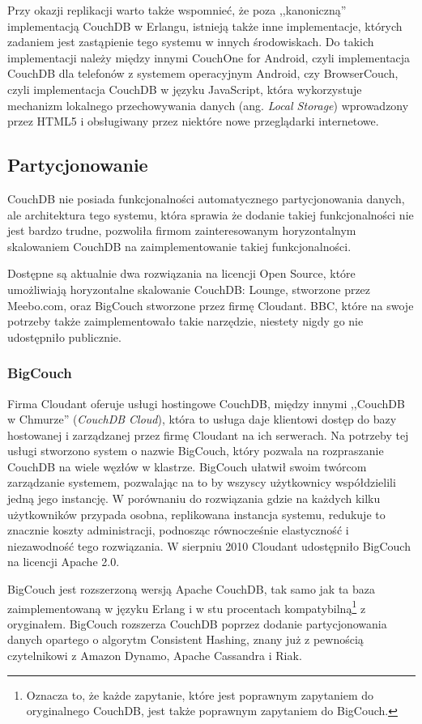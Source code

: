 Przy okazji replikacji warto także wspomnieć, że poza ,,kanoniczną'' implementacją CouchDB w Erlangu, istnieją także inne implementacje, których zadaniem jest zastąpienie tego systemu w innych środowiskach.
Do takich implementacji należy między innymi CouchOne for Android, czyli implementacja CouchDB dla telefonów z systemem operacyjnym Android, czy BrowserCouch, czyli implementacja CouchDB w języku JavaScript, która wykorzystuje mechanizm lokalnego przechowywania danych (ang. \emph{Local Storage}) wprowadzony przez HTML5 i obsługiwany przez niektóre nowe przeglądarki internetowe.

\subsection*{Partycjonowanie}

CouchDB nie posiada funkcjonalności automatycznego partycjonowania danych, ale architektura tego systemu, która sprawia że dodanie takiej funkcjonalności nie jest bardzo trudne, pozwoliła firmom zainteresowanym horyzontalnym skalowaniem CouchDB na zaimplementowanie takiej funkcjonalności.

Dostępne są aktualnie dwa rozwiązania na licencji Open Source, które umożliwiają horyzontalne skalowanie CouchDB: Lounge, stworzone przez Meebo.com, oraz BigCouch stworzone przez firmę Cloudant.
BBC, które na swoje potrzeby także zaimplementowało takie narzędzie, niestety nigdy go nie udostępniło publicznie.	

\subsubsection*{BigCouch}

Firma Cloudant oferuje usługi hostingowe CouchDB, między innymi ,,CouchDB w Chmurze'' (\emph{CouchDB Cloud}), która to usługa daje klientowi dostęp do bazy hostowanej i zarządzanej przez firmę Cloudant na ich serwerach.
Na potrzeby tej usługi stworzono system o nazwie BigCouch, który pozwala na rozpraszanie CouchDB na wiele węzłów w klastrze. 
BigCouch ułatwił swoim twórcom zarządzanie systemem, pozwalając na to by wszyscy użytkownicy współdzielili jedną jego instancję.
W porównaniu do rozwiązania gdzie na każdych kilku użytkowników przypada osobna, replikowana instancja systemu, redukuje to znacznie koszty administracji, podnosząc równocześnie elastyczność i niezawodność tego rozwiązania.
W sierpniu 2010 Cloudant udostępniło BigCouch na licencji Apache 2.0. 

BigCouch jest rozszerzoną wersją Apache CouchDB, tak samo jak ta baza zaimplementowaną w języku Erlang i w stu procentach kompatybilną\footnote{Oznacza to, że każde zapytanie, które jest poprawnym zapytaniem do oryginalnego CouchDB, jest także poprawnym zapytaniem do BigCouch.} z oryginałem.
BigCouch rozszerza CouchDB poprzez dodanie partycjonowania danych opartego o algorytm Consistent Hashing, znany już z pewnością czytelnikowi z Amazon Dynamo, Apache Cassandra i Riak.

